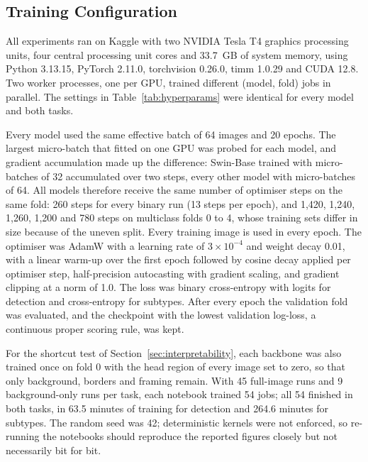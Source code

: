 \documentclass[final,3p,times,number]{elsarticle}
\begin{document}
\subsection{Training Configuration}
\label{sec:training}

All experiments ran on Kaggle with two NVIDIA Tesla T4 graphics processing units, four central processing unit cores and 33.7~GB of system memory, using Python 3.13.15, PyTorch 2.11.0, torchvision 0.26.0, timm 1.0.29 and CUDA 12.8. Two worker processes, one per GPU, trained different (model, fold) jobs in parallel. The settings in Table~\ref{tab:hyperparams} were identical for every model and both tasks.

Every model used the same effective batch of 64 images and 20 epochs. The largest micro-batch that fitted on one GPU was probed for each model, and gradient accumulation made up the difference: Swin-Base trained with micro-batches of 32 accumulated over two steps, every other model with micro-batches of 64. All models therefore receive the same number of optimiser steps on the same fold: 260 steps for every binary run (13 steps per epoch), and 1,420, 1,240, 1,260, 1,200 and 780 steps on multiclass folds 0 to 4, whose training sets differ in size because of the uneven split. Every training image is used in every epoch. The optimiser was AdamW with a learning rate of $3\times 10^{-4}$ and weight decay 0.01, with a linear warm-up over the first epoch followed by cosine decay applied per optimiser step, half-precision autocasting with gradient scaling, and gradient clipping at a norm of 1.0. The loss was binary cross-entropy with logits for detection and cross-entropy for subtypes. After every epoch the validation fold was evaluated, and the checkpoint with the lowest validation log-loss, a continuous proper scoring rule, was kept.

For the shortcut test of Section~\ref{sec:interpretability}, each backbone was also trained once on fold 0 with the head region of every image set to zero, so that only background, borders and framing remain. With 45 full-image runs and 9 background-only runs per task, each notebook trained 54 jobs; all 54 finished in both tasks, in 63.5 minutes of training for detection and 264.6 minutes for subtypes. The random seed was 42; deterministic kernels were not enforced, so re-running the notebooks should reproduce the reported figures closely but not necessarily bit for bit.
\end{document}
